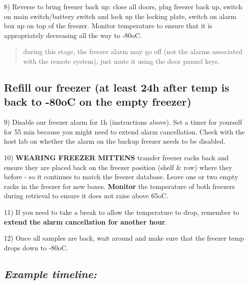 \documentclass[
  letterpaper,
  DIV=11,
  numbers=noendperiod]{scrreprt}
\begin{document}
8) Reverse to bring freezer back up: close all doors, plug freezer back
up, switch on main switch/battery switch and lock up the locking plate,
switch on alarm box up on top of the freezer. Monitor temperature to
ensure that it is appropriately decreasing all the way to -80oC.

\begin{quote}
during this stage, the freezer alarm may go off (not the alarms
associated with the remote system), just mute it using the door pannel
keys.
\end{quote}

\hypertarget{refill-our-freezer-at-least-24h-after-temp-is-back-to--80oc-on-the-empty-freezer}{%
\subsection*{\texorpdfstring{\textbf{Refill our freezer (at least 24h
after temp is back to -80oC on the empty
freezer)}}{Refill our freezer (at least 24h after temp is back to -80oC on the empty freezer)}}\label{refill-our-freezer-at-least-24h-after-temp-is-back-to--80oc-on-the-empty-freezer}}

9) Disable our freezer alarm for 1h (instructions above). Set a timer
for yourself for 55 min because you might need to extend alarm
cancellation. Check with the host lab on whether the alarm on the backup
freezer needs to be disabled.

10) \textbf{WEARING FREEZER MITTENS} transfer freezer racks back and
ensure they are placed back on the freezer position (shelf \& row) where
they before - so it continues to match the freezer database. Leave one
or two empty racks in the freezer for new boxes. \textbf{Monitor} the
temperature of both freezers during retrieval to ensure it does not
raise above 65oC.

11) If you need to take a break to allow the temperature to drop,
remember to \textbf{extend the alarm cancellation for another hour}.

12) Once all samples are back, wait around and make sure that the
freezer temp drops down to -80oC.

\hypertarget{example-timeline}{%
\subsection*{\texorpdfstring{\textbf{\emph{Example
timeline:}}}{Example timeline:}}\label{example-timeline}}
\end{document}
